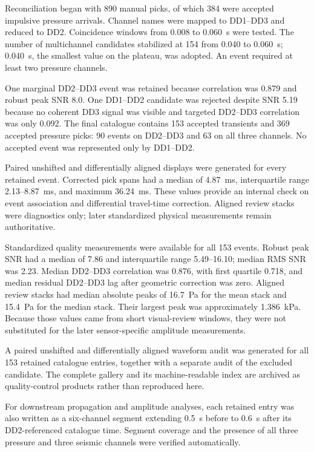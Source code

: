 \documentclass[]{seismica}
\begin{document}
Reconciliation began with 890 manual picks, of which 384 were accepted
impulsive pressure arrivals. Channel names were mapped to DD1--DD3 and reduced
to DD2. Coincidence windows from 0.008 to 0.060~s were tested. The number of
multichannel candidates stabilized at 154 from 0.040 to 0.060~s; 0.040~s, the
smallest value on the plateau, was adopted. An event required at least two
pressure channels.

One marginal DD2--DD3 event was retained because correlation was 0.879 and
robust peak SNR 8.0. One DD1--DD2 candidate was rejected despite SNR 5.19
because no coherent DD3 signal was visible and targeted DD2--DD3 correlation
was only 0.092. The final catalogue contains 153 accepted transients and 369
accepted pressure picks: 90 events on DD2--DD3 and 63 on all three channels.
No accepted event was represented only by DD1--DD2.

Paired unshifted and differentially aligned displays were generated for every
retained event. Corrected pick spans had a median of 4.87~ms, interquartile
range 2.13--8.87~ms, and maximum 36.24~ms. These values provide an internal
check on event association and differential travel-time correction. Aligned
review stacks were diagnostics only; later standardized physical measurements
remain authoritative.

Standardized quality measurements were available for all 153 events. Robust
peak SNR had a median of 7.86 and interquartile range 5.49--16.10; median RMS
SNR was 2.23. Median DD2--DD3 correlation was 0.876, with first quartile
0.718, and median residual DD2--DD3 lag after geometric correction was zero.
Aligned review stacks had median absolute peaks of 16.7~Pa for the mean stack
and 15.4~Pa for the median stack. Their largest peak was approximately
1.386~kPa. Because those values came from short visual-review windows, they
were not substituted for the later sensor-specific amplitude measurements.

A paired unshifted and differentially aligned waveform audit was generated for
all 153 retained catalogue entries, together with a separate audit of the
excluded candidate. The complete gallery and its machine-readable index are
archived as quality-control products rather than reproduced here.

For downstream propagation and amplitude analyses, each retained entry was
also written as a six-channel segment extending 0.5~s before to 0.6~s after its
DD2-referenced catalogue time. Segment coverage and the presence of all three
pressure and three seismic channels were verified automatically.
\end{document}
